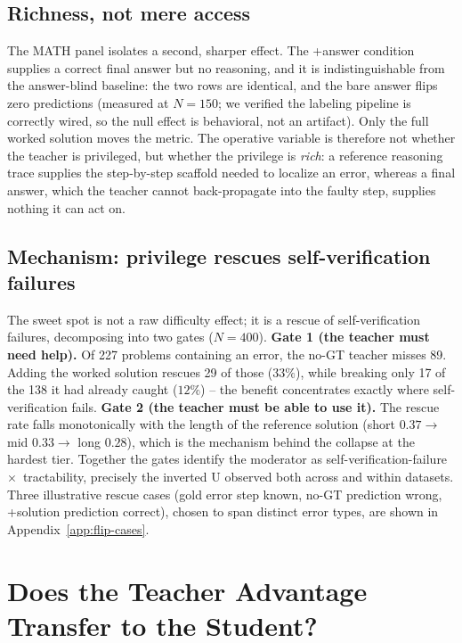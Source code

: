 \documentclass{article}
\begin{document}
\subsection{Richness, not mere access}
The MATH panel isolates a second, sharper effect. The +answer condition supplies a
correct final answer but no reasoning, and it is indistinguishable from the
answer-blind baseline: the two rows are identical, and the bare answer flips
zero predictions (measured at $N=150$; we verified the labeling pipeline is
correctly wired, so the null effect is behavioral, not an artifact). Only
the full worked solution moves the metric. The operative variable is
therefore not whether the teacher is privileged, but whether the privilege
is \emph{rich}: a reference reasoning trace supplies the step-by-step
scaffold needed to localize an error, whereas a final answer, which the
teacher cannot back-propagate into the faulty step, supplies nothing it can
act on.

\subsection{Mechanism: privilege rescues self-verification failures}
\label{sec:mechanism}
The sweet spot is not a raw difficulty effect; it is a rescue of
self-verification failures, decomposing into two gates ($N=400$). \textbf{Gate
1 (the teacher must need help).} Of 227 problems containing an error, the
no-GT teacher misses 89. Adding the worked solution rescues 29 of those
($33\%$), while breaking only 17 of the 138 it had already caught ($12\%$) --
the benefit concentrates exactly where self-verification fails. \textbf{Gate
2 (the teacher must be able to use it).} The rescue rate falls monotonically
with the length of the reference solution (short $0.37 \to$ mid $0.33 \to$
long $0.28$), which is the mechanism behind the collapse at the hardest
tier. Together the gates identify the moderator as
self-verification-failure~$\times$~tractability, precisely the inverted U
observed both across and within datasets. Three illustrative rescue cases
(gold error step known, no-GT prediction wrong, +solution prediction correct),
chosen to span distinct error types, are shown in
Appendix~\ref{app:flip-cases}.

\section{Does the Teacher Advantage Transfer to the Student?}
\label{sec:transfer}
\end{document}
